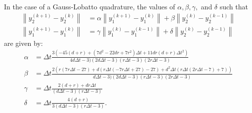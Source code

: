 \documentclass[12pt]{article}
\begin{document}
In the case of a Gauss-Lobatto quadrature, the values of 
$\alpha, \beta, \gamma,$ and $\delta$ such that
\begin{align}
    \left\| y^{(k+1)}_2 - y^{(k)}_2 \right\| &= 
        \alpha \left\| y^{(k+1)}_1 - y^{(k)}_1 \right\|
      + \beta  \left\| y^{(k)}_2 - y^{(k-1)}_2 \right\|\\
    \left\| y^{(k+1)}_1 - y^{(k)}_1 \right\| &= 
        \gamma \left\| y^{(k)}_1 - y^{(k-1)}_1 \right\|
      + \delta \left\| y^{(k)}_2 - y^{(k-1)}_2 \right\|
\end{align}
are given by:
\begin{align*}
    \alpha &= \Delta t
        \frac{3(-45(d+r) + (7d^2 -22dr + 7r^2)\Delta t 
            + 11dr(d+r)\Delta t^2)}
        {4d\Delta t - 3)(2d\Delta t - 3)(r\Delta t - 3)(2r\Delta t - 3)}\\
    \beta &= \Delta t
        \frac{2(r(7r\Delta t - 27) + d(r\Delta t(-7r\Delta t + 27) - 27) 
            + d^2\Delta t(r\Delta t(2r\Delta t - 7) + 7)) }
        {d\Delta t - 3)(2d\Delta t - 3)(r\Delta t - 3)(2r\Delta t - 3)}\\
    \gamma &= \Delta t\frac{2(d+r)+dr\Delta t}{(d\Delta t - 3)(r\Delta t - 3)}\\
    \delta &= \Delta t\frac{4(d+r)}{3(d\Delta t - 3)(r\Delta t - 3)}.
\end{align*}
\end{document}
